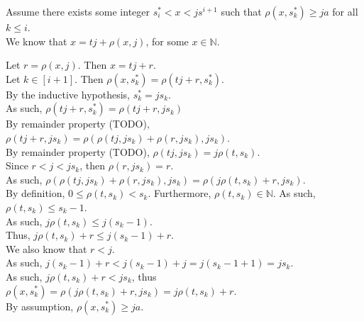 \documentclass[a4paper,12pt]{article}
\begin{document}
\noindent Assume there exists some integer $s^*_i < x < js^{i+1}$ such that $\rho(x, s^*_k) \geq ja$ for all $k \leq i$.\\

\noindent We know that $x = tj + \rho(x, j)$, for some $x \in \mathbb{N}$.

\noindent Let $r = \rho(x, j)$. Then $x = tj + r$.\\

\noindent Let $k \in [i + 1]$. Then $\rho(x, s^*_k) = \rho(tj + r, s^*_k)$.\\

\noindent By the inductive hypothesis, $s^*_k = js_k$.\\

\noindent As such, $\rho(tj + r, s^*_k) = \rho(tj + r, js_k)$\\

\noindent By remainder property (TODO), $\rho(tj + r, js_k) = \rho(\rho(tj, js_k) + \rho(r, js_k), js_k)$.\\

\noindent By remainder property (TODO), $\rho(tj, js_k) = j \rho(t, s_k)$.\\

\noindent Since $r < j < js_k$, then $\rho(r, js_k) = r$.\\

\noindent As such, $\rho(\rho(tj, js_k) + \rho(r, js_k), js_k) = \rho(j \rho(t, s_k) + r, js_k)$.\\

\noindent By definition, $0 \leq \rho(t, s_k) < s_k$. Furthermore, $\rho(t, s_k) \in \mathbb{N}$. As such, $\rho(t, s_k) \leq s_k - 1$.\\

\noindent As such, $j \rho(t, s_k) \leq j(s_k - 1)$.\\

\noindent Thus, $j \rho(t, s_k) + r \leq j(s_k - 1) + r$.\\

\noindent We also know that $r < j$.\\

\noindent As such, $j(s_k - 1) + r < j(s_k - 1) + j = j(s_k - 1 + 1) = js_k$.\\

\noindent As such, $j \rho(t, s_k) + r < js_k$, thus $\rho(x, s^*_k) = \rho(j \rho(t, s_k) + r, js_k) = j \rho(t, s_k) + r$.\\

\noindent By assumption, $\rho(x, s^*_k) \geq ja$.\\
\end{document}
